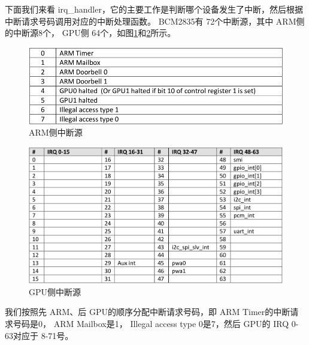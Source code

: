 \documentclass[main.tex]{subfiles}
\begin{document}
\begin{CJK*}{UTF8}{song}
\begin{code}
\label{code:3-14}
\inputminted[firstline=147,lastline=153,linenos,numbersep=5pt,frame=lines,framesep=2mm]{gas}{src/chapter03/kernel/entry.S}
\end{code}

下面我们来看 irq\_\-handler，它的主要工作是判断哪个设备发生了中断，然后根据中断请求号码调用对应的中断处理函数。 BCM2835有 72个中断源，其中 ARM侧的中断源8个， GPU侧 64个，如图\ref{figure:3-3}和\ref{figure:3-4}所示。

\begin{figure}[htp]
\centering
\includegraphics[scale=0.4]{figures/3-3.png}
\caption{ARM侧中断源}
\label{figure:3-3}
\end{figure}

\begin{figure}[htp]
\centering
\includegraphics[scale=0.4]{figures/3-4.png}
\caption{GPU侧中断源}
\label{figure:3-4}
\end{figure}

我们按照先 ARM、后 GPU的顺序分配中断请求号码，即 ARM Timer的中断请求号码是0， ARM Mailbox是1， Illegal access type 0是7，然后 GPU的 IRQ 0-63对应于 8-71号。

\begin{code}
\label{code:3-15}
\inputminted[firstline=91,lastline=125,linenos,numbersep=5pt,frame=lines,framesep=2mm]{c}{src/chapter03/kernel/machdep.c}
\end{code}


\end{CJK*}
\end{document}
